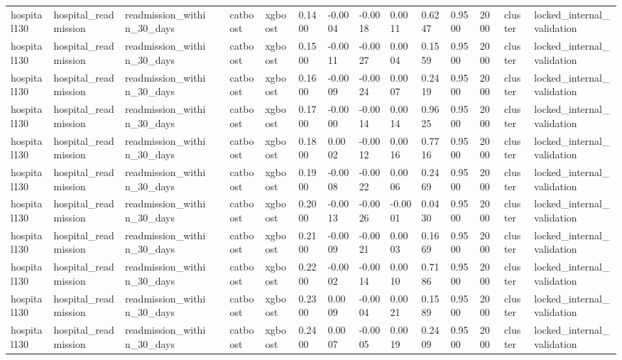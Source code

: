 \begin{tabular}{lllllllllllllll}
hospital130 & hospital\_readmission & readmission\_within\_30\_days &  & catboost & xgboost & 0.1400 & -0.0004 & -0.0018 & 0.0011 & 0.6247 & 0.9500 & 2000 & cluster & locked\_internal\_validation \\
hospital130 & hospital\_readmission & readmission\_within\_30\_days &  & catboost & xgboost & 0.1500 & -0.0011 & -0.0027 & 0.0004 & 0.1559 & 0.9500 & 2000 & cluster & locked\_internal\_validation \\
hospital130 & hospital\_readmission & readmission\_within\_30\_days &  & catboost & xgboost & 0.1600 & -0.0009 & -0.0024 & 0.0007 & 0.2419 & 0.9500 & 2000 & cluster & locked\_internal\_validation \\
hospital130 & hospital\_readmission & readmission\_within\_30\_days &  & catboost & xgboost & 0.1700 & -0.0000 & -0.0014 & 0.0014 & 0.9625 & 0.9500 & 2000 & cluster & locked\_internal\_validation \\
hospital130 & hospital\_readmission & readmission\_within\_30\_days &  & catboost & xgboost & 0.1800 & 0.0002 & -0.0012 & 0.0016 & 0.7716 & 0.9500 & 2000 & cluster & locked\_internal\_validation \\
hospital130 & hospital\_readmission & readmission\_within\_30\_days &  & catboost & xgboost & 0.1900 & -0.0008 & -0.0022 & 0.0006 & 0.2469 & 0.9500 & 2000 & cluster & locked\_internal\_validation \\
hospital130 & hospital\_readmission & readmission\_within\_30\_days &  & catboost & xgboost & 0.2000 & -0.0013 & -0.0026 & -0.0001 & 0.0430 & 0.9500 & 2000 & cluster & locked\_internal\_validation \\
hospital130 & hospital\_readmission & readmission\_within\_30\_days &  & catboost & xgboost & 0.2100 & -0.0009 & -0.0021 & 0.0003 & 0.1669 & 0.9500 & 2000 & cluster & locked\_internal\_validation \\
hospital130 & hospital\_readmission & readmission\_within\_30\_days &  & catboost & xgboost & 0.2200 & -0.0002 & -0.0014 & 0.0010 & 0.7186 & 0.9500 & 2000 & cluster & locked\_internal\_validation \\
hospital130 & hospital\_readmission & readmission\_within\_30\_days &  & catboost & xgboost & 0.2300 & 0.0009 & -0.0004 & 0.0021 & 0.1589 & 0.9500 & 2000 & cluster & locked\_internal\_validation \\
hospital130 & hospital\_readmission & readmission\_within\_30\_days &  & catboost & xgboost & 0.2400 & 0.0007 & -0.0005 & 0.0019 & 0.2409 & 0.9500 & 2000 & cluster & locked\_internal\_validation \\

\end{tabular}
